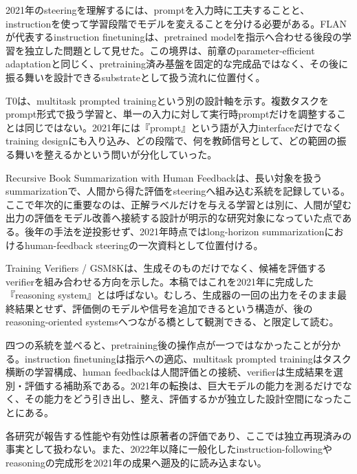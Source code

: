 
2021年のsteeringを理解するには、promptを入力時に工夫することと、instructionを使って学習段階でモデルを変えることを分ける必要がある。FLANが代表するinstruction finetuningは、pretrained modelを指示へ合わせる後段の学習を独立した問題として見せた。この境界は、前章のparameter-efficient adaptationと同じく、pretraining済み基盤を固定的な完成品ではなく、その後に振る舞いを設計できるsubstrateとして扱う流れに位置付く。\autocite{src-8b2f7c40f4a4}


T0は、multitask prompted trainingという別の設計軸を示す。複数タスクをprompt形式で扱う学習と、単一の入力に対して実行時promptだけを調整することは同じではない。2021年には『prompt』という語が入力interfaceだけでなくtraining designにも入り込み、どの段階で、何を教師信号として、どの範囲の振る舞いを整えるかという問いが分化していった。\autocite{src-6339600396eb}


Recursive Book Summarization with Human Feedbackは、長い対象を扱うsummarizationで、人間から得た評価をsteeringへ組み込む系統を記録している。ここで年次的に重要なのは、正解ラベルだけを与える学習とは別に、人間が望む出力の評価をモデル改善へ接続する設計が明示的な研究対象になっていた点である。後年の手法を逆投影せず、2021年時点ではlong-horizon summarizationにおけるhuman-feedback steeringの一次資料として位置付ける。\autocite{src-7f768525daf5,src-90a37f62aeab}


Training Verifiers / GSM8Kは、生成そのものだけでなく、候補を評価するverifierを組み合わせる方向を示した。本稿ではこれを2021年に完成した『reasoning system』とは呼ばない。むしろ、生成器の一回の出力をそのまま最終結果とせず、評価側のモデルや信号を追加できるという構造が、後のreasoning-oriented systemsへつながる橋として観測できる、と限定して読む。\autocite{src-34f845c1e710,src-750bc3eeb1bc}


四つの系統を並べると、pretraining後の操作点が一つではなかったことが分かる。instruction finetuningは指示への適応、multitask prompted trainingはタスク横断の学習構成、human feedbackは人間評価との接続、verifierは生成結果を選別・評価する補助系である。2021年の転換は、巨大モデルの能力を測るだけでなく、その能力をどう引き出し、整え、評価するかが独立した設計空間になったことにある。\autocite{src-34f845c1e710,src-6339600396eb,src-750bc3eeb1bc,src-7f768525daf5,src-8b2f7c40f4a4,src-90a37f62aeab}


\begin{claimboundary}
各研究が報告する性能や有効性は原著者の評価であり、ここでは独立再現済みの事実として扱わない。また、2022年以降に一般化したinstruction-followingやreasoningの完成形を2021年の成果へ遡及的に読み込まない。\autocite{src-34f845c1e710,src-6339600396eb,src-750bc3eeb1bc,src-7f768525daf5,src-8b2f7c40f4a4,src-90a37f62aeab}
\end{claimboundary}
